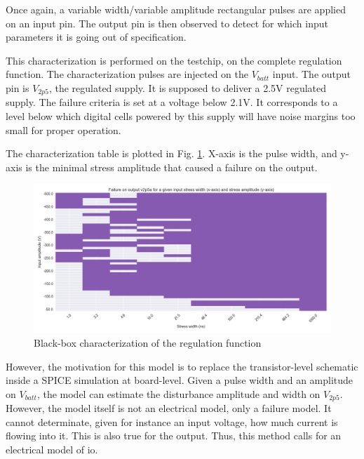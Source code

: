 Once again, a variable width/variable amplitude rectangular pulses are applied on an input pin.
The output pin is then observed to detect for which input parameters it is going out of specification.

This characterization is performed on the testchip, on the complete regulation function.
The characterization pulses are injected on the $V_{batt}$ input.
The output pin is $V_{2p5}$, the regulated supply.
It is supposed to deliver a 2.5V regulated supply.
The failure criteria is set at a voltage below 2.1V.
It corresponds to a level below which digital cells powered by this supply will have noise margins too small for proper operation.


The characterization table is plotted in Fig. \ref{fig:cz-black-box}.
X-axis is the pulse width, and y-axis is the minimal stress amplitude that caused a failure on the output.

\begin{figure}[!h]
  \centering
  \includegraphics[width=\textwidth]{src/1/figures/black_box_regulator.png}
  \caption{Black-box characterization of the regulation function}
  \label{fig:cz-black-box}
\end{figure}

However, the motivation for this model is to replace the transistor-level schematic inside a SPICE simulation at board-level.
Given a pulse width and an amplitude on $V_{batt}$, the model can estimate the disturbance amplitude and width on $V_{2p5}$.
However, the model itself is not an electrical model, only a failure model.
It cannot determinate, given for instance an input voltage, how much current is flowing into it.
This is also true for the output.
Thus, this method calls for an electrical model of \gls{io}.

